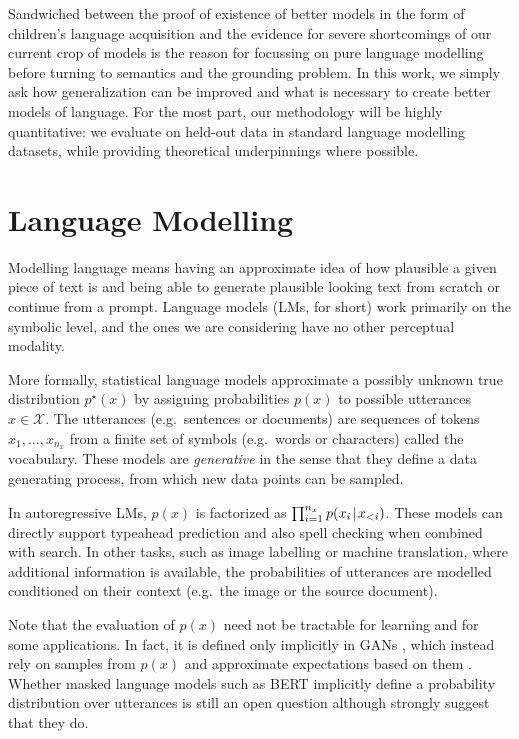 \documentclass[12pt,a4paper,oneside]{book}
\newcommand{\tmid}{\hspace{0.08em}|\hspace{0.11em}}
\newcommand{\cX}{\mathcal{X}}
\begin{document}
Sandwiched between the proof of existence of better models in the form of children's language acquisition \citep{cristia2017child,pullum2002empirical} and the evidence for severe shortcomings of our current crop of models is the reason for focussing on pure language modelling before turning to semantics and the grounding problem.
In this work, we simply ask how generalization can be improved and what is necessary to create better models of language.
For the most part, our methodology will be highly quantitative: we evaluate on held-out data in standard language modelling datasets, while providing theoretical underpinnings where possible.

\section{Language Modelling}

Modelling language means having an approximate idea of how plausible a given piece of text is and being able to generate plausible looking text from scratch or continue from a prompt.
Language models (LMs, for short) work primarily on the symbolic level, and the ones we are considering have no other perceptual modality.

More formally, statistical language models approximate a possibly unknown true distribution $p^\star(x)$ by assigning probabilities $p(x)$ to possible utterances $x \in \cX$.
The utterances (e.g.\ sentences or documents) are sequences of tokens $x_1, \dots, x_{n_x}$ from a finite set of symbols (e.g.\ words or characters) called the vocabulary.
These models are \emph{generative} in the sense that they define a data generating process, from which new data points can be sampled.

In autoregressive LMs, $p(x)$ is factorized as $\prod_{i=1}^{n_x} p(x_i\tmid x_{<i})$.
These models can directly support typeahead prediction and also spell checking when combined with search.
In other tasks, such as image labelling or machine translation, where additional information is available, the probabilities of utterances are modelled conditioned on their context (e.g.\ the image or the source document).

Note that the evaluation of $p(x)$ need not be tractable for learning and for some applications.
In fact, it is defined only implicitly in GANs \citep{goodfellow2014generative}, which instead rely on samples from $p(x)$ and approximate expectations based on them \citep{huszar2017variational}.
Whether masked language models such as BERT \citep{devlin2018bert} implicitly define a probability distribution over utterances is still an open question although \citet{goyal2021exposing} strongly suggest that they do.
\end{document}
